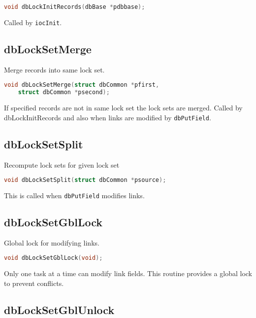 \begin{lstlisting}[language=C]
void dbLockInitRecords(dbBase *pdbbase);
\end{lstlisting}

Called by \verb|iocInit|.

\subsection{dbLockSetMerge}

Merge records into same lock set.

\begin{lstlisting}[language=C]
void dbLockSetMerge(struct dbCommon *pfirst,
    struct dbCommon *psecond);
\end{lstlisting}

If specified records are not in same lock set the lock sets are merged.
Called by dbLockInitRecords and also when links are modified by \verb|dbPutField|.

\subsection{dbLockSetSplit}

Recompute lock sets for given lock set

\begin{lstlisting}[language=C]
void dbLockSetSplit(struct dbCommon *psource);
\end{lstlisting}

This is called when \verb|dbPutField| modifies links.

\subsection{dbLockSetGblLock}

Global lock for modifying links.

\begin{lstlisting}[language=C]
void dbLockSetGblLock(void);
\end{lstlisting}

Only one task at a time can modify link fields.
This routine provides a global lock to prevent conflicts.

\subsection{dbLockSetGblUnlock}

